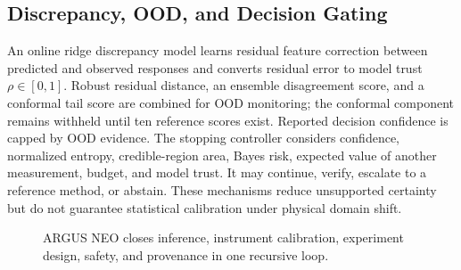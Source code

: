 \documentclass[conference]{IEEEtran}
\begin{document}
\subsection{Discrepancy, OOD, and Decision Gating}
An online ridge discrepancy model learns residual feature correction between predicted and observed responses and converts residual error to model trust $\rho\in[0,1]$. Robust residual distance, an ensemble disagreement score, and a conformal tail score are combined for OOD monitoring; the conformal component remains withheld until ten reference scores exist. Reported decision confidence is capped by OOD evidence. The stopping controller considers confidence, normalized entropy, credible-region area, Bayes risk, expected value of another measurement, budget, and model trust. It may continue, verify, escalate to a reference method, or abstain. These mechanisms reduce unsupported certainty but do not guarantee statistical calibration under physical domain shift.

\begin{figure}[t]
\centering
{}
\caption{ARGUS NEO closes inference, instrument calibration, experiment design, safety, and provenance in one recursive loop.}
\label{fig:neo-loop}
\end{figure}
\end{document}
